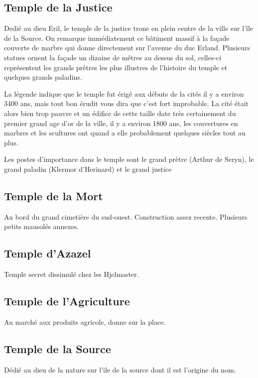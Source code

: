 \subsection{Temple de la Justice}

Dedié au dieu Eril, le temple de la justice trone en plein centre de la ville 
sur l'île de la Source. On remarque immédiatement ce bâtiment massif à la 
façade couverte de marbre qui donne directement sur l'avenue du duc Erland. 
Plusieurs statues ornent la façade un dizaine de mêtres au dessus du sol, 
celles-ci représentent les grands prêtres les plus illustres de l'histoire 
du temple et quelques grands paladins. 

La légende indique que le temple fut érigé aux débuts de la cités il y a 
environ 3400 ans, mais tout bon érudit vous dira que c'est fort improbable. 
La cité était alors bien trop pauvre et un édifice de cette taille date très 
certainement du premier grand age d'or de la ville, il y a environ 1800 ans,
les couvertures en marbres et les scultures ont quand a elle probablement 
quelques siècles tout au plus.

Les postes d'importance dans le temple sont le grand prètre (Arthur de Seryn), 
le grand paladin (Klermor d'Herinard) et le grand justice

\subsection{Temple de la Mort}

Au bord du grand cimetière du sud-ouest. Construction assez recente. Plusieurs petits mausolés annexes.

\subsection{Temple d'Azazel}

Temple secret dissimulé chez les Hjelmaster.

\subsection{Temple de l'Agriculture}

Au marché aux produits agricole, donne sur la place.

\subsection{Temple de la Source}

Dédié au dieu de la nature sur l'ile de la source dont il est l'origine du nom.

